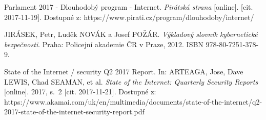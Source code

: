

\begin{literatura}{99}

Parlament 2017 - Dlouhodobý program - Internet. \textit{Pirátská strana} [online]. [cit. 2017-11-19]. Dostupné z: https://www.pirati.cz/program/dlouhodoby/internet/

JIRÁSEK, Petr, Luděk NOVÁK a Josef POŽÁR. \textit{Výkladový slovník kybernetické bezpečnosti}. Praha: Policejní akademie ČR v Praze, 2012. ISBN 978-80-7251-378-9.

State of the Internet / security Q2 2017 Report. In: ARTEAGA, Jose, Dave LEWIS, Chad SEAMAN, et al. \textit{State of the Internet: Quarterly Security Reports} [online]. 2017, s.~2 [cit. 2017-11-21]. Dostupné z: https://www.akamai.com/uk/en/multimedia/documents/state-of-the-internet/q2-2017-state-of-the-internet-security-report.pdf


\end{literatura}


%
%
%
